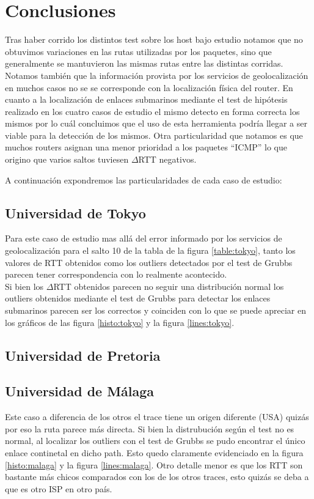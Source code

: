 \section{Conclusiones}

Tras haber corrido los distintos test sobre los host bajo estudio notamos que no obtuvimos variaciones en las rutas utilizadas por los paquetes, sino que generalmente se mantuvieron las mismas rutas entre las distintas corridas. 
Notamos también que la información provista por los servicios de geolocalización en muchos casos no se se corresponde con la localización física del router.
En cuanto a la localización de enlaces submarinos mediante el test de hipótesis realizado en los cuatro casos de estudio el mismo detecto en forma correcta los mismos por lo cuál concluimos que el uso de esta herramienta podría llegar a ser viable para la detección de los mismos.
Otra particularidad que notamos es que muchos routers asignan una menor prioridad a los paquetes ``ICMP'' lo que origino que varios saltos tuviesen $\Delta$RTT negativos.

A continuación expondremos las particularidades de cada caso de estudio:

\subsection{Universidad de Tokyo}

Para este caso de estudio mas allá del error informado por los servicios de geolocalización para el salto 10 de la tabla de la figura \ref{table:tokyo}, tanto los valores de RTT obtenidos como los outliers detectados por el test de Grubbs parecen tener correspondencia con lo realmente acontecido.\\
Si bien los $\Delta$RTT obtenidos parecen no seguir una distribución normal los outliers obtenidos mediante el test de Grubbs para detectar los enlaces submarinos parecen ser los correctos y coinciden con lo que se puede apreciar en los gráficos de las figura \ref{histo:tokyo} y la figura \ref{lines:tokyo}.

\subsection{Universidad de Pretoria}

\subsection{Universidad de Málaga}
Este caso a diferencia de los otros el trace tiene un origen diferente (USA) quizás por eso la ruta parece más directa.
Si bien la distrubución según el test no es normal, al localizar los outliers con el test de Grubbs se pudo encontrar el único enlace continetal en dicho path. Esto quedo claramente evidenciado en la figura \ref{histo:malaga} y la figura \ref{lines:malaga}.
Otro detalle menor es que los RTT son bastante más chicos comparados con los de los otros traces, esto quizás se deba a que es otro ISP en otro país.




